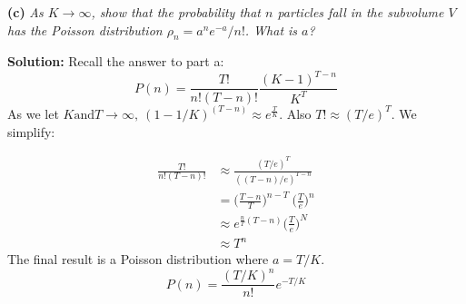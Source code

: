 \documentclass[11pt]{article}
\begin{document}
\vspace{2mm}
\noindent
\textbf{(c)}
\textit{As $K \rightarrow \infty$, show that the probability that $n$ particles fall in the subvolume $V$ has the Poisson distribution $\rho_n = a^n e^{-a}/n!$. What is $a$?}

\vspace{2mm}
\noindent
\textbf{Solution:}
Recall the answer to part a:
$$
P(n) = \frac{T!}{n!(T - n)!} \frac{(K - 1)^{T - n}}{K^T}
$$
As we let $K \text{and} T \rightarrow \infty, \ (1 - 1/K)^(T-n) \approx e^{\frac{T}{K}}.$ Also $T! \approx (T/e)^T$. We simplify:

\begin{align*}
\frac{T!}{n!(T - n)!}
&\approx \frac{(T/e)^T}{((T-n)/e)^{T-n}}
\\
&= \Big(\frac{T-n}{T}\Big)^{n-T}  \ \Big(\frac{T}{e}\Big) ^n
\\
&\approx e^{\frac{n}{T}(T-n)} \Big(\frac{T}{e}\Big)^N
\\
&\approx T^n
\end{align*}
The final result is a Poisson distribution where $a = T/K.$
$$
\boxed{
P(n) = \frac{(T/K)^n}{n!} e^{-T/K}
}
$$
\end{document}
